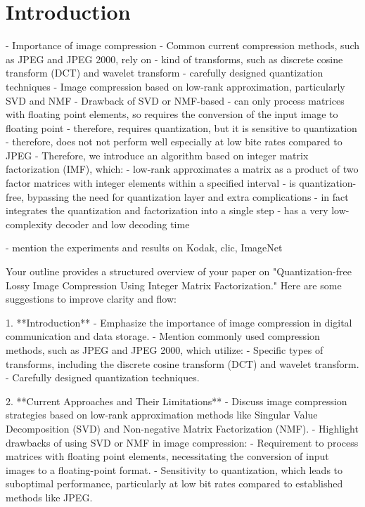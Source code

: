 \section{Introduction} \label{sec: introduction}


- Importance of image compression
- Common current compression methods, such as JPEG and JPEG 2000, rely on
	- kind of transforms, such as discrete cosine transform (DCT) and wavelet transform
	- carefully designed quantization techniques  
- Image compression based on low-rank approximation, particularly SVD and NMF
- Drawback of SVD or NMF-based
	- can only process matrices with floating point elements, so requires the conversion of the input image to floating point
	- therefore, requires quantization, but it is sensitive to quantization
	- therefore, does not not perform well especially at low bite rates compared to JPEG
- Therefore, we introduce an algorithm based on integer matrix factorization (IMF), which:
	- low-rank approximates a matrix as a product of two factor matrices with integer elements within a specified interval
	- is quantization-free, bypassing the need for quantization layer and extra complications 
	- in fact integrates the quantization and factorization into a single step
	- has a very low-complexity decoder and low decoding time
	 
- mention the experiments and results on Kodak, clic, ImageNet 


Your outline provides a structured overview of your paper on "Quantization-free Lossy Image Compression Using Integer Matrix Factorization." Here are some suggestions to improve clarity and flow:

1. **Introduction**
- Emphasize the importance of image compression in digital communication and data storage.
- Mention commonly used compression methods, such as JPEG and JPEG 2000, which utilize:
- Specific types of transforms, including the discrete cosine transform (DCT) and wavelet transform.
- Carefully designed quantization techniques.

2. **Current Approaches and Their Limitations**
- Discuss image compression strategies based on low-rank approximation methods like Singular Value Decomposition (SVD) and Non-negative Matrix Factorization (NMF).
- Highlight drawbacks of using SVD or NMF in image compression:
- Requirement to process matrices with floating point elements, necessitating the conversion of input images to a floating-point format.
- Sensitivity to quantization, which leads to suboptimal performance, particularly at low bit rates compared to established methods like JPEG.

